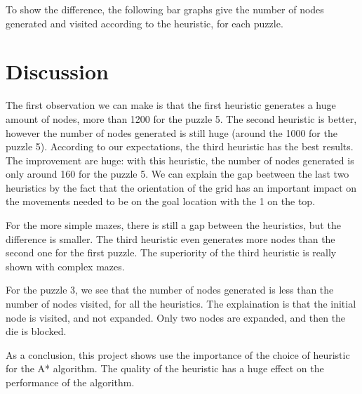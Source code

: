 \documentclass[]{article}
\begin{document}
To show the difference, the following bar graphs give the number of nodes generated and visited according to the heuristic, for each puzzle.











\section{Discussion}

The first observation we can make is that the first heuristic generates a huge amount of nodes, more than 1200 for the puzzle 5.
The second heuristic is better, however the number of nodes generated is still huge (around the 1000 for the puzzle 5).
According to our expectations, the third heuristic has the best results.
The improvement are huge: with this heuristic, the number of nodes generated is only around 160 for the puzzle 5.
We can explain the gap beetween the last two heuristics by the fact that the orientation of the grid has an important impact on the movements needed to be on the goal location with the 1 on the top.

For the more simple mazes, there is still a gap between the heuristics, but the difference is smaller.
The third heuristic even generates more nodes than the second one for the first puzzle.
The superiority of the third heuristic is really shown with complex mazes.

For the puzzle 3, we see that the number of nodes generated is less than the number of nodes visited, for all the heuristics.
The explaination is that the initial node is visited, and not expanded. Only two nodes are expanded, and then the die is blocked.

As a conclusion, this project shows use the importance of the choice of heuristic for the A* algorithm.
The quality of the heuristic has a huge effect on the performance of the algorithm.
\end{document}
